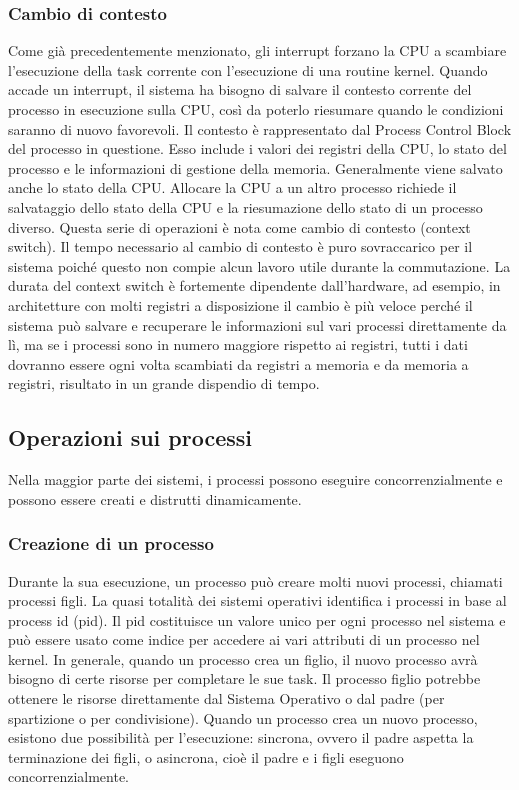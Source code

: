 \documentclass[a4paper]{article}
\begin{document}
\subsubsection{Cambio di contesto}
Come già precedentemente menzionato, gli interrupt forzano la CPU a scambiare l'esecuzione della task corrente con l'esecuzione di una routine kernel. Quando accade un interrupt, il sistema ha bisogno di salvare il contesto corrente del processo in esecuzione sulla CPU, così da poterlo riesumare quando le condizioni saranno di nuovo favorevoli. Il contesto è rappresentato dal Process Control Block del processo in questione. Esso include i valori dei registri della CPU, lo stato del processo e le informazioni di gestione della memoria. Generalmente viene salvato anche lo stato della CPU. \newline
Allocare la CPU a un altro processo richiede il salvataggio dello stato della CPU e la riesumazione dello stato di un processo diverso. Questa serie di operazioni è nota come cambio di contesto (context switch). \newline
Il tempo necessario al cambio di contesto è puro sovraccarico per il sistema poiché questo non compie alcun lavoro utile durante la commutazione. La durata del context switch è fortemente dipendente dall'hardware, ad esempio, in architetture con molti registri a disposizione il cambio è più veloce perché il sistema può salvare e recuperare le informazioni sul vari processi direttamente da lì, ma se i processi sono in numero maggiore rispetto ai registri, tutti i dati dovranno essere ogni volta scambiati da registri a memoria e da memoria a registri, risultato in un grande dispendio di tempo.

\subsection{Operazioni sui processi}
Nella maggior parte dei sistemi, i processi possono eseguire concorrenzialmente e possono essere creati e distrutti dinamicamente.

\subsubsection{Creazione di un processo}
Durante la sua esecuzione, un processo può creare molti nuovi processi, chiamati processi figli. La quasi totalità dei sistemi operativi identifica i processi in base al process id (pid). Il pid costituisce un valore unico per ogni processo nel sistema e può essere usato come indice per accedere ai vari attributi di un processo nel kernel. \newline
In generale, quando un processo crea un figlio, il nuovo processo avrà bisogno di certe risorse per completare le sue task. Il processo figlio potrebbe ottenere le risorse direttamente dal Sistema Operativo o dal padre (per spartizione o per condivisione). \newline
Quando un processo crea un nuovo processo, esistono due possibilità per l'esecuzione: sincrona, ovvero il padre aspetta la terminazione dei figli, o asincrona, cioè il padre e i figli eseguono concorrenzialmente.
\end{document}
